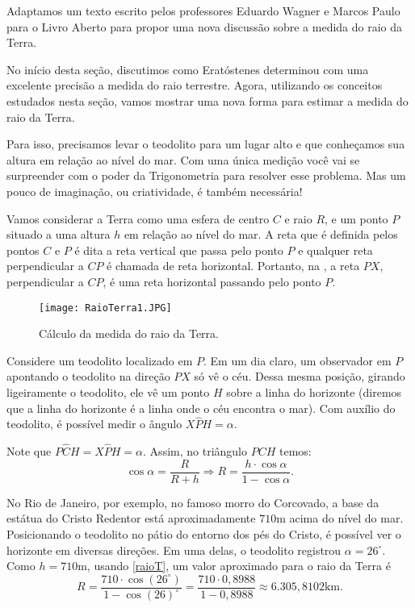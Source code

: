 
Adaptamos um texto escrito pelos professores Eduardo Wagner e Marcos Paulo para o Livro Aberto para propor uma nova discussão sobre a medida do raio da Terra.

No início desta seção, discutimos como Eratóstenes determinou com uma excelente precisão a medida do raio terrestre. Agora, utilizando os conceitos estudados nesta seção, vamos mostrar  uma nova forma para estimar a medida do raio da Terra. 
        
Para isso, precisamos levar o teodolito para um lugar alto e que conheçamos sua altura em relação ao nível do mar. Com uma única medição você vai se surpreender com o poder da Trigonometria para resolver esse problema. Mas um pouco de imaginação, ou criatividade, é também necessária!

Vamos considerar a Terra como uma esfera de centro $C$ e raio $R$, e um ponto $P$ situado a uma altura $h$ em relação ao nível do mar. A reta que é definida pelos pontos $C$ e $P$ é dita a reta vertical que passa pelo ponto $P$ e qualquer reta perpendicular a $CP$ é chamada de reta horizontal. Portanto, na , a reta $PX$, perpendicular a $CP$, é uma reta horizontal passando pelo ponto $P$.

   \begin{figure}[H]
    \centering
    \texttt{[image: RaioTerra1.JPG]}
    \caption{Cálculo da medida do raio da Terra.}
    \label{RaioTerra}
\end{figure}



Considere um teodolito localizado em $P$. Em um dia claro, um observador em $P$ apontando o teodolito na direção $PX$ só vê o céu. Dessa mesma posição, girando ligeiramente o teodolito, ele vê um ponto $H$ sobre a linha do horizonte (diremos que a linha do horizonte é a linha onde o céu encontra o mar). Com auxílio do teodolito, é possível medir o ângulo $X\hat{P}H=\alpha$.

Note que $P\hat{C}H=X\hat{P}H=\alpha$. Assim, no triângulo $PCH$ temos:
\begin{equation}\label{raioT}
\cos\alpha=\frac{R}{R+h} \Rightarrow R=\frac{h\cdot\cos\alpha}{1-\cos\alpha}.
\end{equation}

No Rio de Janeiro, por exemplo, no famoso morro do Corcovado, a base da estátua do Cristo Redentor está aproximadamente $710$m acima do nível do mar. Posicionando o teodolito no pátio do entorno dos pés do Cristo, é possível ver o horizonte em diversas direções. Em uma delas, o teodolito registrou $\alpha=26^\circ$. Como $h=710$m, usando \eqref{raioT}, um valor aproximado para o raio da Terra é 
$$R=\frac{710\cdot\cos(26^\circ)}{1-\cos(26)^\circ}=\frac{710\cdot0,8988}{1-0,8988}\approx 6.305,8102\text{km}.$$

